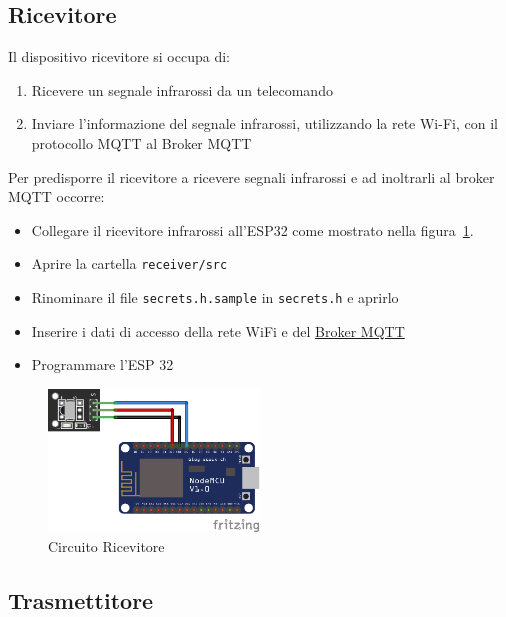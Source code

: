 \documentclass[a4paper,11pt]{article}
\begin{document}
    \subsection{Ricevitore}
    \label{subsec:receiver}

    Il dispositivo ricevitore si occupa di:

    \begin{enumerate}
        \item Ricevere un segnale infrarossi da un telecomando
        \item Inviare l'informazione del segnale infrarossi, utilizzando la rete Wi-Fi, con il protocollo MQTT al Broker MQTT
    \end{enumerate}

    Per predisporre il ricevitore a ricevere segnali infrarossi e ad inoltrarli al broker MQTT occorre:
    \begin{itemize}
        \item Collegare il ricevitore infrarossi all'ESP32 come mostrato nella figura~\ref{fig:circuito_ricevitore}.
        \item Aprire la cartella \texttt{receiver/src}
        \item Rinominare il file \texttt{secrets.h.sample} in \texttt{secrets.h} e aprirlo
        \item Inserire i dati di accesso della rete WiFi e del \hyperref[subsec:Broker]{Broker MQTT}
        \item Programmare l'ESP 32
    \end{itemize}

    \begin{figure}[H]
      \centering
      \includegraphics[width=0.5\textwidth,height=\textheight,keepaspectratio]{assets/receiver_fritzing}
      \caption{Circuito Ricevitore}
      \label{fig:circuito_ricevitore}
    \end{figure}


    \subsection{Trasmettitore}
    \label{subsec:transmitter}
\end{document}
